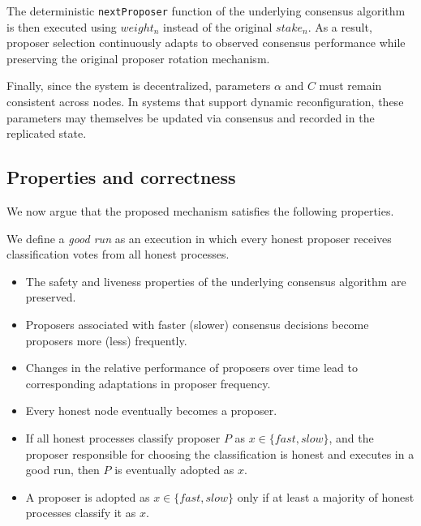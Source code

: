 The deterministic \texttt{nextProposer} function of the underlying consensus algorithm is then executed using $weight_n$ instead of the original $stake_n$.
As a result, proposer selection continuously adapts to observed consensus performance while preserving the original proposer rotation mechanism.

Finally, since the system is decentralized, parameters $\alpha$ and $C$ must remain consistent across nodes. 
In systems that support dynamic reconfiguration, these parameters may themselves be updated via consensus and recorded in the replicated state.


\subsection{Properties and correctness}
\label{subsec:correctness}

We now argue that the proposed mechanism satisfies the following properties.

We define a \textit{good run} as an execution in which every honest proposer receives classification votes from all honest processes.

\begin{itemize}
\item[P.1] The safety and liveness properties of the underlying consensus algorithm are preserved.

\item[P.2] Proposers associated with faster (slower) consensus decisions become proposers more (less) frequently.

\item[P.3] Changes in the relative performance of proposers over time lead to corresponding adaptations in proposer frequency.

\item[P.4] Every honest node eventually becomes a proposer.

\item[P.5] If all honest processes classify proposer $P$ as $x \in \{ \textit{fast}, \textit{slow}\}$, and the proposer responsible for choosing the classification is honest and executes in a good run, then $P$ is eventually adopted as $x$.

\item[P.6] A proposer is adopted as $x \in \{ \textit{fast}, \textit{slow}\}$ only if at least a majority of honest processes classify it as $x$.
\end{itemize}


